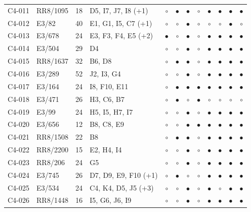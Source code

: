 {\begin{longtable}{llrp{3.9cm}cccccccc}
    C4-011 & RR8/1095 & 18 & D5, I7, J7, I8 (+1) & $\circ$ & $\bullet$ & $\bullet$ & $\circ$ & $\bullet$ & $\bullet$ & $\bullet$ & $\bullet$ \\
    C4-012 & E3/82 & 40 & E1, G1, I5, C7 (+1) & $\circ$ & $\circ$ & $\bullet$ & $\circ$ & $\circ$ & $\circ$ & $\bullet$ & $\circ$ \\
    C4-013 & E3/678 & 24 & E3, F3, F4, E5 (+2) & $\bullet$ & $\circ$ & $\bullet$ & $\circ$ & $\bullet$ & $\bullet$ & $\bullet$ & $\bullet$ \\
    C4-014 & E3/504 & 29 & D4 & $\circ$ & $\circ$ & $\bullet$ & $\circ$ & $\bullet$ & $\bullet$ & $\bullet$ & $\bullet$ \\
    C4-015 & RR8/1637 & 32 & B6, D8 & $\circ$ & $\bullet$ & $\bullet$ & $\circ$ & $\bullet$ & $\bullet$ & $\bullet$ & $\bullet$ \\
    C4-016 & E3/289 & 52 & J2, I3, G4 & $\circ$ & $\circ$ & $\bullet$ & $\circ$ & $\bullet$ & $\bullet$ & $\bullet$ & $\bullet$ \\
    C4-017 & E3/164 & 24 & I8, F10, E11 & $\circ$ & $\bullet$ & $\bullet$ & $\bullet$ & $\bullet$ & $\bullet$ & $\bullet$ & $\bullet$ \\
    C4-018 & E3/471 & 26 & H3, C6, B7 & $\circ$ & $\bullet$ & $\circ$ & $\bullet$ & $\circ$ & $\circ$ & $\circ$ & $\circ$ \\
    C4-019 & E3/99 & 24 & H5, I5, H7, I7 & $\circ$ & $\circ$ & $\bullet$ & $\circ$ & $\bullet$ & $\bullet$ & $\bullet$ & $\bullet$ \\
    C4-020 & E3/656 & 12 & B8, C8, E9 & $\circ$ & $\circ$ & $\bullet$ & $\bullet$ & $\bullet$ & $\bullet$ & $\bullet$ & $\bullet$ \\
    C4-021 & RR8/1508 & 22 & B8 & $\circ$ & $\bullet$ & $\bullet$ & $\circ$ & $\bullet$ & $\bullet$ & $\bullet$ & $\bullet$ \\
    C4-022 & RR8/2200 & 15 & E2, H4, I4 & $\circ$ & $\circ$ & $\bullet$ & $\circ$ & $\bullet$ & $\bullet$ & $\bullet$ & $\bullet$ \\
    C4-023 & RR8/206 & 24 & G5 & $\circ$ & $\circ$ & $\bullet$ & $\circ$ & $\bullet$ & $\bullet$ & $\bullet$ & $\bullet$ \\
    C4-024 & E3/745 & 26 & D7, D9, E9, F10 (+1) & $\circ$ & $\bullet$ & $\circ$ & $\circ$ & $\bullet$ & $\bullet$ & $\bullet$ & $\bullet$ \\
    C4-025 & E3/534 & 24 & C4, K4, D5, J5 (+3) & $\circ$ & $\circ$ & $\bullet$ & $\circ$ & $\bullet$ & $\circ$ & $\bullet$ & $\bullet$ \\
    C4-026 & RR8/1448 & 16 & I5, G6, J6, I9 & $\circ$ & $\circ$ & $\bullet$ & $\circ$ & $\bullet$ & $\bullet$ & $\bullet$ & $\bullet$ \\

\end{longtable}}
